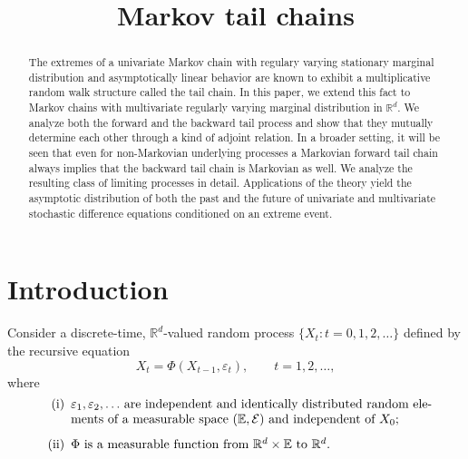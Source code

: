 \documentclass{aptpubarxiv}
\numberwithin{equation}{section}
\begin{document}
\title{Markov tail chains}


\begin{abstract}
The extremes of a univariate Markov chain with regulary varying stationary marginal distribution and asymptotically linear behavior are known to exhibit a multiplicative random walk structure called the tail chain. In this paper, we extend this fact to Markov chains with multivariate regularly varying marginal distribution in $\mathbb{R}^d$. We analyze both the forward and the backward tail process and show that they mutually determine each other through a kind of adjoint relation. In a broader setting, it will be seen that even for non-Markovian underlying processes a Markovian forward tail chain always implies that the backward tail chain is Markovian as well. We analyze the resulting class of limiting processes in detail. Applications of the theory yield the asymptotic distribution of both the past and the future of univariate and multivariate stochastic difference equations conditioned on an extreme event.
\end{abstract}



\section{Introduction}
\label{S:intro}

Consider a discrete-time, $\mathbb{R}^d$-valued random process $\{ X_t : t = 0, 1, 2, \ldots \}$ defined by the recursive equation
\begin{equation}
\label{E:MC:1}
	X_t = \Phi ( X_{t-1}, {\varepsilon}_t ), \qquad t = 1, 2, \ldots,
\end{equation}
where
\vspace{0.2cm}
\begin{equation}
\label{E:MC:2}
\mbox{\begin{minipage}[h]{0.90\textwidth}
\begin{itemize}
\item[(i)] ${\varepsilon}_1, {\varepsilon}_2, \ldots$ are independent and identically distributed random elements of a measurable space $(\mathbb{E}, \mathcal{E})$ and independent of $X_0$;
\item[(ii)] $\Phi$ is a measurable function from ${\mathbb{R}}^d \times {\mathbb{E}}$ to ${\mathbb{R}}^d$.
\end{itemize}
\end{minipage}}
\end{equation}
\end{document}
